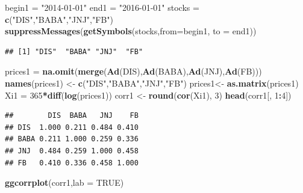 \documentclass[]{article}
\newenvironment{Shaded}{\begin{snugshade}}{\end{snugshade}}
\newcommand{\KeywordTok}[1]{\textcolor[rgb]{0.13,0.29,0.53}{\textbf{#1}}}
\newcommand{\DataTypeTok}[1]{\textcolor[rgb]{0.13,0.29,0.53}{#1}}
\newcommand{\DecValTok}[1]{\textcolor[rgb]{0.00,0.00,0.81}{#1}}
\newcommand{\StringTok}[1]{\textcolor[rgb]{0.31,0.60,0.02}{#1}}
\newcommand{\OtherTok}[1]{\textcolor[rgb]{0.56,0.35,0.01}{#1}}
\newcommand{\OperatorTok}[1]{\textcolor[rgb]{0.81,0.36,0.00}{\textbf{#1}}}
\newcommand{\NormalTok}[1]{#1}
\begin{document}
\begin{Shaded}
\begin{Highlighting}[]
\NormalTok{begin1 =}\StringTok{ "2014-01-01"}
\NormalTok{end1 =}\StringTok{ "2016-01-01"}
\NormalTok{stocks =}\StringTok{ }\KeywordTok{c}\NormalTok{(}\StringTok{"DIS"}\NormalTok{,}\StringTok{"BABA"}\NormalTok{,}\StringTok{"JNJ"}\NormalTok{,}\StringTok{"FB"}\NormalTok{)}
\KeywordTok{suppressMessages}\NormalTok{(}\KeywordTok{getSymbols}\NormalTok{(stocks,}\DataTypeTok{from=}\NormalTok{begin1, }\DataTypeTok{to =}\NormalTok{ end1))}
\end{Highlighting}
\end{Shaded}

\begin{verbatim}
## [1] "DIS"  "BABA" "JNJ"  "FB"
\end{verbatim}

\begin{Shaded}
\begin{Highlighting}[]
\NormalTok{prices1 =}\StringTok{ }\KeywordTok{na.omit}\NormalTok{(}\KeywordTok{merge}\NormalTok{(}\KeywordTok{Ad}\NormalTok{(DIS),}\KeywordTok{Ad}\NormalTok{(BABA),}\KeywordTok{Ad}\NormalTok{(JNJ),}\KeywordTok{Ad}\NormalTok{(FB)))}
\KeywordTok{names}\NormalTok{(prices1) <-}\StringTok{ }\KeywordTok{c}\NormalTok{(}\StringTok{"DIS"}\NormalTok{,}\StringTok{"BABA"}\NormalTok{,}\StringTok{"JNJ"}\NormalTok{,}\StringTok{"FB"}\NormalTok{)}
\NormalTok{prices1<-}\StringTok{ }\KeywordTok{as.matrix}\NormalTok{(prices1)}
\NormalTok{Xi1 =}\StringTok{ }\DecValTok{365}\OperatorTok{*}\KeywordTok{diff}\NormalTok{(}\KeywordTok{log}\NormalTok{(prices1))}
\NormalTok{corr1 <-}\StringTok{ }\KeywordTok{round}\NormalTok{(}\KeywordTok{cor}\NormalTok{(Xi1), }\DecValTok{3}\NormalTok{)}
\KeywordTok{head}\NormalTok{(corr1[, }\DecValTok{1}\OperatorTok{:}\DecValTok{4}\NormalTok{])}
\end{Highlighting}
\end{Shaded}

\begin{verbatim}
##        DIS  BABA   JNJ    FB
## DIS  1.000 0.211 0.484 0.410
## BABA 0.211 1.000 0.259 0.336
## JNJ  0.484 0.259 1.000 0.458
## FB   0.410 0.336 0.458 1.000
\end{verbatim}

\begin{Shaded}
\begin{Highlighting}[]
\KeywordTok{ggcorrplot}\NormalTok{(corr1,}\DataTypeTok{lab =} \OtherTok{TRUE}\NormalTok{)}
\end{Highlighting}
\end{Shaded}
\end{document}
